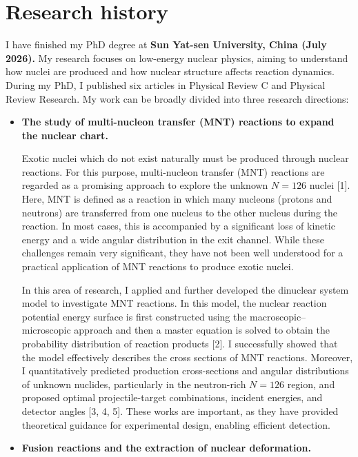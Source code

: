 \documentclass[10pt]{article}
\begin{document}
\section*{Research history}
I have finished my PhD degree at
\textbf{Sun Yat-sen University, China (July 2026).} My research focuses on low-energy nuclear physics, aiming to understand how nuclei are produced and how nuclear structure affects reaction dynamics. During my PhD, I published six articles in Physical Review C and Physical Review Research. My work can be broadly divided into three research directions:
\begin{itemize}[leftmargin=1.2em,itemsep=4pt,topsep=2pt,label={\color{accent}$\blacktriangleright$}]
\item \textbf{The study of multi-nucleon transfer (MNT) reactions to expand the nuclear chart.}

Exotic nuclei which do not exist naturally must be produced through nuclear reactions. For this purpose, multi-nucleon transfer (MNT) reactions are regarded as a promising approach to explore the unknown $N=126$ nuclei [1]. Here, MNT is defined as a reaction in which many nucleons (protons and neutrons) are transferred from one nucleus to the other nucleus during the reaction. In most cases, this is accompanied by a significant loss of kinetic energy and a wide angular distribution in the exit channel. While these challenges remain very significant, they have not been well understood for a practical application of MNT reactions to produce exotic nuclei.

In this area of research, I applied and further developed the dinuclear system model to investigate MNT reactions. In this model, the nuclear reaction potential energy surface is first constructed using the macroscopic–microscopic approach and then a master equation is solved to obtain the probability distribution of reaction products [2]. I successfully showed that the model effectively describes the cross sections of MNT reactions. Moreover, I quantitatively predicted production cross-sections and angular distributions of unknown nuclides, particularly in the neutron-rich $N=126$ region, and proposed optimal projectile-target combinations, incident energies, and detector angles [3, 4, 5]. These works are important, as they have provided theoretical guidance for experimental design, enabling efficient detection.

\item \textbf{Fusion reactions and the extraction of nuclear deformation.} 


\end{itemize}
\end{document}
